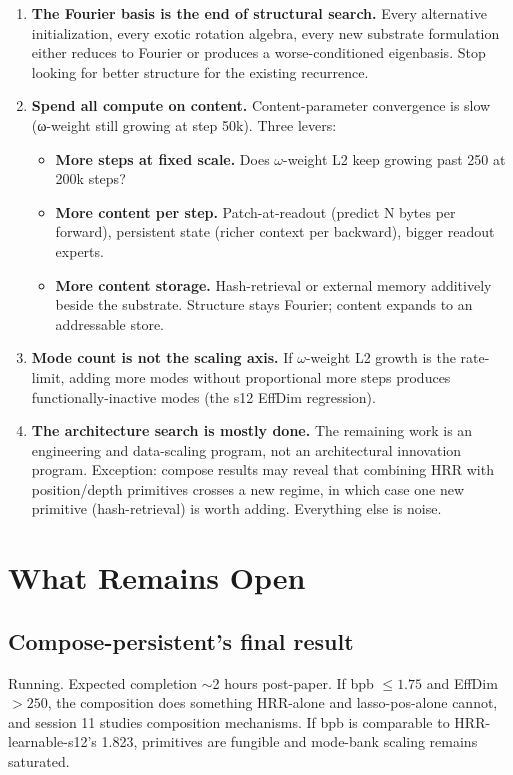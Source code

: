 \documentclass[11pt,a4paper]{report}
\begin{document}
\begin{enumerate}
\item \textbf{The Fourier basis is the end of structural search.} Every alternative initialization, every exotic rotation algebra, every new substrate formulation either reduces to Fourier or produces a worse-conditioned eigenbasis. Stop looking for better structure for the existing recurrence.

\item \textbf{Spend all compute on content.} Content-parameter convergence is slow (ω-weight still growing at step 50k). Three levers:
\begin{itemize}[nosep]
\item \textbf{More steps at fixed scale.} Does $\omega$-weight L2 keep growing past 250 at 200k steps?
\item \textbf{More content per step.} Patch-at-readout (predict N bytes per forward), persistent state (richer context per backward), bigger readout experts.
\item \textbf{More content storage.} Hash-retrieval or external memory additively beside the substrate. Structure stays Fourier; content expands to an addressable store.
\end{itemize}

\item \textbf{Mode count is not the scaling axis.} If $\omega$-weight L2 growth is the rate-limit, adding more modes without proportional more steps produces functionally-inactive modes (the s12 EffDim regression).

\item \textbf{The architecture search is mostly done.} The remaining work is an engineering and data-scaling program, not an architectural innovation program. Exception: compose results may reveal that combining HRR with position/depth primitives crosses a new regime, in which case one new primitive (hash-retrieval) is worth adding. Everything else is noise.
\end{enumerate}


\chapter{What Remains Open}

\section{Compose-persistent's final result}
Running. Expected completion $\sim$2 hours post-paper. If bpb $\leq 1.75$ and EffDim $> 250$, the composition does something HRR-alone and lasso-pos-alone cannot, and session 11 studies composition mechanisms. If bpb is comparable to HRR-learnable-s12's 1.823, primitives are fungible and mode-bank scaling remains saturated.
\end{document}
